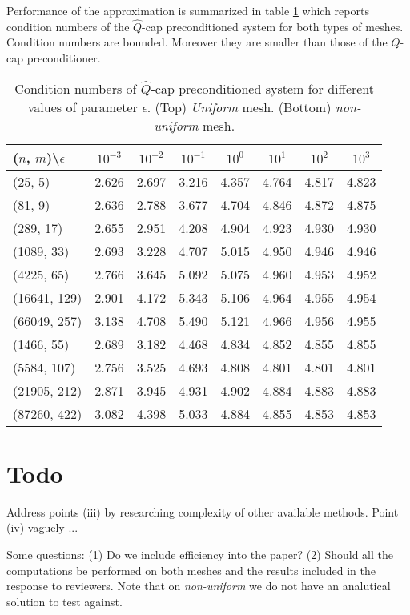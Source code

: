 \documentclass[10pt, a4paper]{article}
\begin{document}
Performance of the approximation is summarized in table \ref{tab:hatQcap} which
reports condition numbers of the $\hat{Q}$-cap preconditioned system for both
types of meshes. Condition numbers are bounded. Moreover they are smaller than
those of the $Q$-cap preconditioner.
%
\begin{table}[hb]
  \caption{Condition numbers of $\hat{Q}$-cap preconditioned system for different 
  values of parameter $\epsilon$. (Top) \textit{Uniform} mesh.
  (Bottom) \textit{non-uniform} mesh.
}
\label{tab:hatQcap}
\footnotesize{
\begin{tabular}{l|ccccccc}
\hline
($n$, $m$)\textbackslash $\epsilon$ & $10^{-3}$ & $10^{-2}$ & $10^{-1}$ & $10^{0}$ & $10^{1}$ & $10^{2}$ & $10^{3}$\\
\hline
(25, 5) & 2.626 & 2.697 & 3.216 & 4.357 & 4.764 & 4.817 & 4.823\\
(81, 9) & 2.636 & 2.788 & 3.677 & 4.704 & 4.846 & 4.872 & 4.875\\
(289, 17) & 2.655 & 2.951 & 4.208 & 4.904 & 4.923 & 4.930 & 4.930\\
(1089, 33) & 2.693 & 3.228 & 4.707 & 5.015 & 4.950 & 4.946 & 4.946\\
(4225, 65) & 2.766 & 3.645 & 5.092 & 5.075 & 4.960 & 4.953 & 4.952\\
(16641, 129) & 2.901 & 4.172 & 5.343 & 5.106 & 4.964 & 4.955 & 4.954\\
(66049, 257) & 3.138 & 4.708 & 5.490 & 5.121 & 4.966 & 4.956 & 4.955\\
\hline
\hline
(1466, 55) & 2.689 & 3.182 & 4.468 & 4.834 & 4.852 & 4.855 & 4.855\\
(5584, 107) & 2.756 & 3.525 & 4.693 & 4.808 & 4.801 & 4.801 & 4.801\\
(21905, 212) & 2.871 & 3.945 & 4.931 & 4.902 & 4.884 & 4.883 & 4.883\\
(87260, 422) & 3.082 & 4.398 & 5.033 & 4.884 & 4.855 & 4.853 & 4.853\\
\hline
\end{tabular}
}
\end{table}



\section*{Todo}
Address points (iii) by researching complexity of other available methods. 
Point (iv) vaguely ...

Some questions: (1) Do we include efficiency into the paper? (2) Should all the 
computations be performed on both meshes and the results included in the response 
to reviewers. Note that on \textit{non-uniform} we do not have an analutical 
solution to test against.



\end{document}
